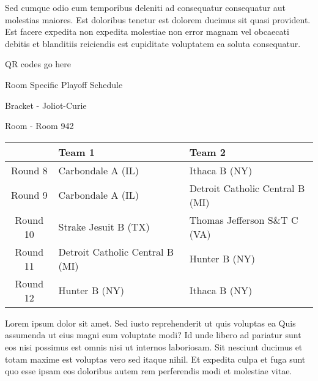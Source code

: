 \documentclass{article}%
\begin{document}
\newline%
Sed cumque odio eum temporibus deleniti ad consequatur consequatur aut molestias maiores. Est doloribus tenetur est dolorem ducimus sit quasi provident. Est facere expedita non expedita molestiae non error magnam vel obcaecati debitis et blanditiis reiciendis est cupiditate voluptatem ea soluta consequatur.%
\vspace*{140pt}%
\begin{center}%
\begin{Huge}%
QR codes go here%
\end{Huge}%
\end{center}%
\newpage%
\begin{center}%
\begin{Huge}%
Room Specific Playoff Schedule%
\end{Huge}%
\vspace*{8pt}%
\linebreak%
\begin{Large}%
Bracket {-} Joliot{-}Curie%
\end{Large}%
\vspace*{8pt}%
\linebreak%
\vspace*{8pt}%
\begin{Large}%
Room {-} Room 942%
\end{Large}%
\end{center}%
%
\begin{tabularx}{\textwidth}{|c|Y|Y|}%
\hline%
&Team 1&Team 2\\%
\hline%
Round 8&Carbondale A (IL)&Ithaca B (NY)\\%
Round 9&Carbondale A (IL)&Detroit Catholic Central B (MI)\\%
Round 10&Strake Jesuit B (TX)&Thomas Jefferson S\&T C (VA)\\%
Round 11&Detroit Catholic Central B (MI)&Hunter B (NY)\\%
Round 12&Hunter B (NY)&Ithaca B (NY)\\%
\hline%
\end{tabularx}%
\vspace*{8pt}%
\newline%
Lorem ipsum dolor sit amet. Sed iusto reprehenderit ut quis voluptas ea Quis assumenda ut eius magni eum voluptate modi? Id unde libero ad pariatur sunt eos nisi possimus est omnis nisi ut internos laboriosam. Sit nesciunt ducimus et totam maxime est voluptas vero sed itaque nihil. Et expedita culpa et fuga sunt quo esse ipsam eos doloribus autem rem perferendis modi et molestiae vitae.\newline%
\end{document}
